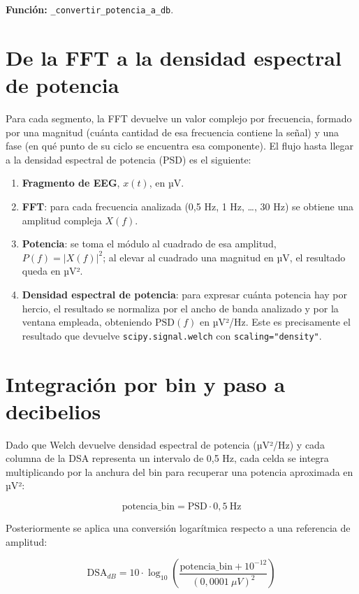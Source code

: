 \documentclass[
  spanish,
  a4paper,
  12pt,
  twoside]{memoir}
\providecommand{\tightlist}{%
  \setlength{\itemsep}{0pt}\setlength{\parskip}{0pt}}
\begin{document}
\textbf{Función:} \texttt{\_convertir\_potencia\_a\_db}.

\section{De la FFT a la densidad espectral de
potencia}\label{de-la-fft-a-la-densidad-espectral-de-potencia}

Para cada segmento, la FFT devuelve un valor complejo por frecuencia,
formado por una magnitud (cuánta cantidad de esa frecuencia contiene la
señal) y una fase (en qué punto de su ciclo se encuentra esa
componente). El flujo hasta llegar a la densidad espectral de potencia
(PSD) es el siguiente:

\begin{enumerate}
\def\labelenumi{\arabic{enumi}.}
\tightlist
\item
  \textbf{Fragmento de EEG}, \(x(t)\), en µV.
\item
  \textbf{FFT}: para cada frecuencia analizada (0,5 Hz, 1 Hz, \ldots, 30
  Hz) se obtiene una amplitud compleja \(X(f)\).
\item
  \textbf{Potencia}: se toma el módulo al cuadrado de esa amplitud,
  \(P(f) = |X(f)|^2\); al elevar al cuadrado una magnitud en µV, el
  resultado queda en µV².
\item
  \textbf{Densidad espectral de potencia}: para expresar cuánta potencia
  hay por hercio, el resultado se normaliza por el ancho de banda
  analizado y por la ventana empleada, obteniendo \(\text{PSD}(f)\) en
  µV²/Hz. Este es precisamente el resultado que devuelve
  \texttt{scipy.signal.welch} con \texttt{scaling="density"}.
\end{enumerate}

\section{Integración por bin y paso a
decibelios}\label{integraciuxf3n-por-bin-y-paso-a-decibelios}

Dado que Welch devuelve densidad espectral de potencia (µV²/Hz) y cada
columna de la DSA representa un intervalo de 0,5 Hz, cada celda se
integra multiplicando por la anchura del bin para recuperar una potencia
aproximada en µV²:

\[\text{potencia\_bin} = \text{PSD} \cdot 0{,}5\ \text{Hz}\]

Posteriormente se aplica una conversión logarítmica respecto a una
referencia de amplitud:

\[\text{DSA}_{dB} = 10 \cdot \log_{10}\!\left(\frac{\text{potencia\_bin} + 10^{-12}}{(0{,}0001\ \mu V)^2}\right)\]
\end{document}
